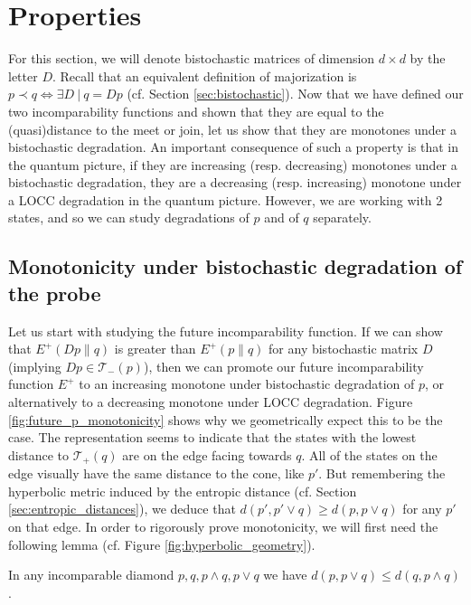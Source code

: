 \section{Properties}

For this section, we will denote bistochastic matrices of dimension $d\times d$ by the letter $D$. Recall that an equivalent definition of majorization is $p \prec q \iff \exists D \: | \: q = Dp$ (cf. Section \ref{sec:bistochastic}). Now that we have defined our two incomparability functions and shown that they are equal to the (quasi)distance to the meet or join, let us show that they are monotones under a bistochastic degradation. An important consequence of such a property is that in the quantum picture, if they are increasing (resp. decreasing) monotones under a bistochastic degradation, they are a decreasing (resp. increasing) monotone under a LOCC degradation in the quantum picture. However, we are working with 2 states, and so we can study degradations of $p$ and of $q$ separately.



\subsection{Monotonicity under bistochastic degradation of the probe} \label{sec:p_monotonicity}

Let us start with studying the future incomparability function. If we can show that $E^+(Dp \parallel q)$ is greater than $E^+(p \parallel q)$ for any bistochastic matrix $D$ (implying $Dp \in \mathcal{T}_-(p)$), then we can promote our future incomparability function $E^+$ to an increasing monotone under bistochastic degradation of $p$, or alternatively to a decreasing monotone under LOCC degradation. Figure \ref{fig:future_p_monotonicity} shows why we geometrically expect this to be the case. The representation seems to indicate that the states with the lowest distance to $\mathcal{T}_+(q)$ are on the edge facing towards $q$. All of the states on the edge visually have the same distance to the cone, like $p'$. But remembering the hyperbolic metric induced by the entropic distance (cf. Section \ref{sec:entropic_distances}), we deduce that $d(p', p' \vee q) \geq d(p, p \vee q)$ for any $p'$ on that edge. In order to rigorously prove monotonicity, we will first need the following lemma (cf. Figure \ref{fig:hyperbolic_geometry}).

\begin{lemma} \label{lem:incomparable_diamond}
    In any incomparable diamond $p, q, p \wedge q, p \vee q$ we have $d(p, p \vee q) \leq d(q, p \wedge q)$.
\end{lemma}

